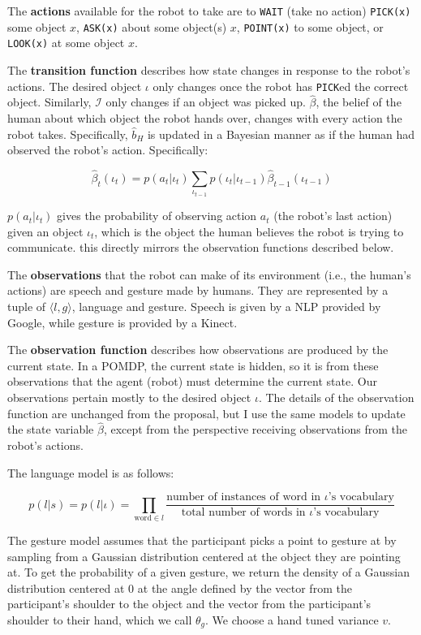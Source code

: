\documentclass{article}
\begin{document}
The \textbf{actions} available for the robot to take are to \texttt{WAIT} (take no action) \texttt{PICK(x)} some object $x$, \texttt{ASK(x)} about some object(s) $x$, \texttt{POINT(x)} to some object, or \texttt{LOOK(x)} at some object $x$. 

The \textbf{transition function} describes how state changes in response to the robot's actions. The desired object $\iota$ only changes once the robot has \texttt{PICK}ed the correct object. Similarly, $\mathcal{I}$ only changes if an object was picked up. $\hat \beta$, the belief of the human about which object the robot hands over, changes with every action the robot takes. Specifically, $\hat b_H$ is updated in a Bayesian manner as if the human had observed the robot's action. Specifically: 

$$\hat\beta_{t}(\iota_t) = p(a_t | \iota_t) \sum_{\iota_{t-1}} p(\iota_t|\iota_{t-1}) \hat\beta_{t-1}(\iota_{t-1})$$

$p(a_t | \iota_t)$ gives the probability of observing action $a_t$ (the robot's last action) given an object $\iota_t$, which is the object the human believes the robot is trying to communicate. this directly mirrors the observation functions described below. 

The \textbf{observations} that the robot can make of its environment (i.e., the human's actions) are speech and gesture made by humans. They are represented by a tuple of $\langle l, g \rangle$, language and gesture. Speech is given by a NLP provided by Google, while gesture is provided by a Kinect. 

The \textbf{observation function} describes how observations are produced by the current state. In a POMDP, the current state is hidden, so it is from these observations that the agent (robot) must determine the current state. Our observations pertain mostly to the desired object $\iota$. The details of the observation function are unchanged from the proposal, but I use the same models to update the state variable $\hat \beta$, except from the perspective receiving observations from the robot's actions. 

The language model is as follows: 

$$ p(l|s) = p(l|\iota) = \prod_{\text{word} \in l} \frac{\text{number of instances of word in $\iota$'s vocabulary}}{\text{total number of words in $\iota$'s vocabulary}}$$

The gesture model assumes that the participant picks a point to gesture at by sampling from a Gaussian distribution centered at the object they are pointing at. To get the probability of a given gesture, we return the density of a Gaussian distribution centered at 0 at the angle defined by the vector from the participant's shoulder to the object and the vector from the participant's shoulder to their hand, which we call $\theta_g$. We choose a hand tuned variance $v$. 
\end{document}
